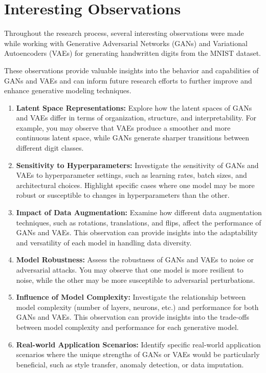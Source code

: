 \documentclass{article}
\begin{document}
\section{Interesting Observations}
Throughout the research process, several interesting observations were made while working with Generative Adversarial Networks (GANs) and Variational Autoencoders (VAEs) for generating handwritten digits from the MNIST dataset.

These observations provide valuable insights into the behavior and capabilities of GANs and VAEs and can inform future research efforts to further improve and enhance generative modeling techniques.

\begin{enumerate}
    \item \textbf{Latent Space Representations:} Explore how the latent spaces of GANs and VAEs differ in terms of organization, structure, and interpretability. For example, you may observe that VAEs produce a smoother and more continuous latent space, while GANs generate sharper transitions between different digit classes.
    \item \textbf{Sensitivity to Hyperparameters:} Investigate the sensitivity of GANs and VAEs to hyperparameter settings, such as learning rates, batch sizes, and architectural choices. Highlight specific cases where one model may be more robust or susceptible to changes in hyperparameters than the other.
    \item \textbf{Impact of Data Augmentation:} Examine how different data augmentation techniques, such as rotations, translations, and flips, affect the performance of GANs and VAEs. This observation can provide insights into the adaptability and versatility of each model in handling data diversity.
    \item \textbf{Model Robustness:} Assess the robustness of GANs and VAEs to noise or adversarial attacks. You may observe that one model is more resilient to noise, while the other may be more susceptible to adversarial perturbations.
    \item \textbf{Influence of Model Complexity:} Investigate the relationship between model complexity (number of layers, neurons, etc.) and performance for both GANs and VAEs. This observation can provide insights into the trade-offs between model complexity and performance for each generative model.
    \item \textbf{Real-world Application Scenarios:} Identify specific real-world application scenarios where the unique strengths of GANs or VAEs would be particularly beneficial, such as style transfer, anomaly detection, or data imputation.
\end{enumerate}
\end{document}
